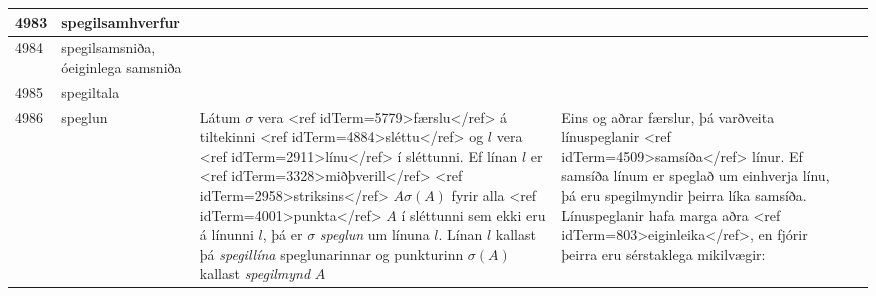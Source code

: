 \begin{longtable}{p{}|p{}|p{}|p{}|p{}}
\hline
4983 & spegilsamhverfur &  &  &  \\
\hline
4984 & spegilsamsniða, óeiginlega samsniða &  &  &  \\
\hline
4985 & spegiltala &  &  &  \\
\hline
4986 & speglun & Látum $\sigma$ vera <ref idTerm=5779>færslu</ref> á tiltekinni <ref idTerm=4884>sléttu</ref> og $l$ vera <ref idTerm=2911>línu</ref> í sléttunni. Ef línan $l$ er <ref idTerm=3328>miðþverill</ref> <ref idTerm=2958>striksins</ref> $A\sigma(A)$ fyrir alla <ref idTerm=4001>punkta</ref> $A$ í sléttunni sem ekki eru á línunni $l$, þá er $\sigma$ \textit{speglun} um línuna $l$. Línan $l$ kallast þá \textit{spegillína} speglunarinnar og punkturinn $\sigma(A)$ kallast \textit{spegilmynd} $A$ & Eins og aðrar færslur, þá varðveita línuspeglanir <ref idTerm=4509>samsíða</ref> línur. Ef samsíða línum er speglað um einhverja línu, þá eru spegilmyndir þeirra líka samsíða. Línuspeglanir hafa marga aðra <ref idTerm=803>eiginleika</ref>, en fjórir þeirra eru sérstaklega mikilvægir:


\end{longtable}
